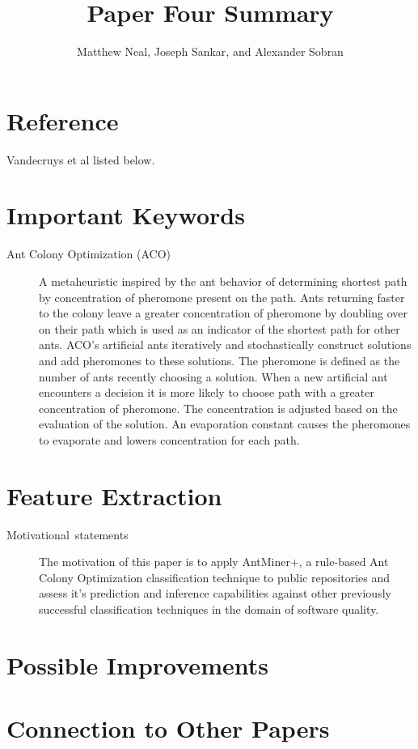 \documentclass[english]{article}
\begin{document}
\title{Paper Four Summary}


\author{Matthew Neal, Joseph Sankar, and Alexander Sobran}

\maketitle

\section*{Reference}

Vandecruys et al \cite{Vandecruys08} listed below.


\section*{Important Keywords}
\begin{description}
\item [{Ant Colony Optimization (ACO)}] A metaheuristic inspired by the ant behavior of determining shortest path by concentration of pheromone present on the path. Ants returning faster to the colony leave a greater concentration of pheromone by doubling over on their path which is used as an indicator of the shortest path for other ants. ACO's artificial ants iteratively and stochastically construct solutions and add pheromones to these solutions. The pheromone is defined as the number of ants recently choosing a solution. When a new artificial ant encounters a decision it is more likely to choose path with a greater concentration of pheromone. The concentration is adjusted based on the evaluation of the solution. An evaporation constant causes the pheromones to evaporate and lowers concentration for each path.
\end{description}

\section*{Feature Extraction}
\begin{description}
\item [{Motivational~statements}] The motivation of this paper is to apply AntMiner+, a rule-based Ant Colony Optimization classification technique to public repositories and assess it's prediction and inference capabilities against other previously successful classification techniques in the domain of software quality.
\end{description}



\section*{Possible Improvements}


\section*{Connection to Other Papers}





\end{document}
